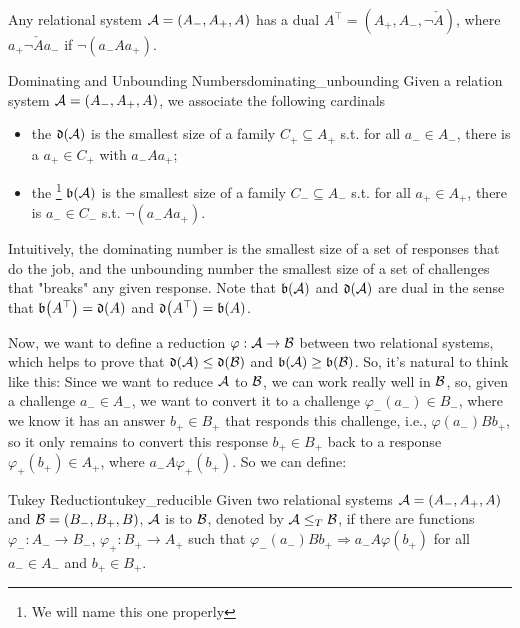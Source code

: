 Any relational system $\mathcal{A}=(A_-,A_+,A)$ has a dual $A^\top=(A_+,A_-,\neg\check{A})$, where $a_+\neg\check{A}a_-$ if $\neg(a_-Aa_+)$.

\begin{definition}{Dominating and Unbounding Numbers}{dominating_unbounding}
    Given a relation system $\mathcal{A}=(A_-,A_+,A)$, we associate the following cardinals
    \begin{itemize}
        \item the  $\mathfrak{d}(\mathcal{A})$ is the smallest size of a family $C_+\subseteq A_+$ s.t. for all $a_-\in A_-$, there is a $a_+\in C_+$ with $a_-Aa_+$;
        \item the \footnote{We will name this one properly} $\mathfrak{b}(\mathcal{A})$ is the smallest size of a family $C_-\subseteq A_-$ s.t. for all $a_+\in A_+$, there is $a_-\in C_-$ s.t. $\neg(a_-Aa_+)$.
    \end{itemize}
\end{definition}

Intuitively, the dominating number is the smallest size of a set of responses that do the job, and the unbounding number the smallest size of a set of challenges that "breaks" any given response. Note that $\mathfrak{b}(\mathcal{A})$ and $\mathfrak{d}(\mathcal{A})$ are dual in the sense that $\mathfrak{b}{\left(A^\top\right)}=\mathfrak{d}(A)$ and $\mathfrak{d}{\left(A^\top\right)}=\mathfrak{b}(A)$.

Now, we want to define a reduction $\varphi:\mathcal{A}\to\mathcal{B}$ between two relational systems, which helps to prove that $\mathfrak{d}(\mathcal{A})\leq\mathfrak{d}(\mathcal{B})$ and $\mathfrak{b}(\mathcal{A})\geq\mathfrak{b}(\mathcal{B})$. So, it's natural to think like this: Since we want to reduce $\mathcal{A}$ to $\mathcal{B}$, we can work really well in $\mathcal{B}$, so, given a challenge $a_-\in A_-$, we want to convert it to a challenge $\varphi_-(a_-)\in B_-$, where we know it has an answer $b_+\in B_+$ that responds this challenge, i.e., $\varphi(a_-)B b_+$, so it only remains to convert this response $b_+\in B_+$ back to a response $\varphi_+(b_+)\in A_+$, where $a_-A\varphi_+(b_+)$. So we can define:

\begin{definition}{Tukey Reduction}{tukey_reducible}
    Given two relational systems $\mathcal{A}=(A_-,A_+,A)$ and $\mathcal{B}=(B_-,B_+,B)$, $\mathcal{A}$ is  to $\mathcal{B}$, denoted by $\mathcal{A}\leq_T\mathcal{B}$, if there are functions $\varphi_-:A_-\to B_-$, $\varphi_+:B_+\to A_+$ such that $\varphi_-(a_-)Bb_+\Rightarrow a_-A\varphi(b_+)$ for all $a_-\in A_-$ and $b_+\in B_+$.
\end{definition}

